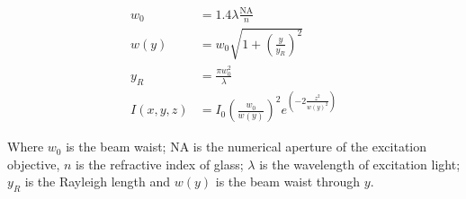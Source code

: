 \begin{align}
  w_0 &= 1.4 \lambda \frac{ \text{NA}}{n}\\
  w(y) &= w_0 \sqrt{1+{\left(\frac{y}{y_R}\right)}^2}\\
  y_R &= \frac{\pi w_0^2}{\lambda}\\
  I(x,y,z) &= I_0 {\left(\frac{w_0}{w(y)}\right)}^2 e^{\left(-2\frac{z^2}{{w(y)}^2}\right)}
\end{align}

Where \(w_0\) is the beam waist; NA is the numerical aperture of the excitation objective, \(n\) is the refractive index of glass; \(\lambda \) is the wavelength of excitation light; \(y_R\) is the Rayleigh length and \(w(y)\) is the beam waist through \(y\).


